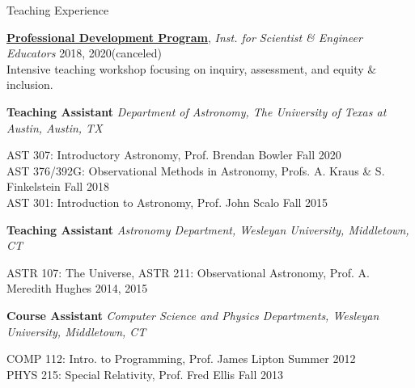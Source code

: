 \documentclass{resume} %
\begin{document}
\begin{rSection}{Teaching Experience}\itemsep -5pt  

    {\bf \href{https://isee.ucsc.edu/programs/pdp/}{Professional Development Program}}, {\em Inst. for Scientist \& Engineer Educators} \hfill 2018, 2020(canceled)\\
    Intensive teaching workshop focusing on inquiry, assessment, and equity \& inclusion.

    {\bf Teaching Assistant} {\em Department of Astronomy, The University of Texas at Austin, Austin, TX}
    \vspace{-5pt}
    \begin{changemargin}{0.3in}{0in}
    AST 307: Introductory Astronomy, Prof. Brendan Bowler \hfill {Fall 2020}\\
    AST 376/392G: Observational Methods in Astronomy, Profs. A. Kraus \& S. Finkelstein \hfill {Fall 2018}\\
    AST 301: Introduction to Astronomy, Prof. John Scalo \hfill {Fall 2015}
    \end{changemargin}
    



    {\bf Teaching Assistant} {\em Astronomy Department, Wesleyan University, Middletown, CT}
    \vspace{-5pt}
    \begin{changemargin}{0.3in}{0in}
    ASTR 107: The Universe, ASTR 211: Observational Astronomy, Prof. A. Meredith Hughes \hfill {2014, 2015}
    \end{changemargin}

    {\bf Course Assistant} {\em Computer Science and Physics Departments, Wesleyan University, Middletown, CT}
    \vspace{-5pt}
    \begin{changemargin}{0.3in}{0in}
    COMP 112: Intro. to Programming, Prof. James Lipton \hfill {Summer 2012}\\
    PHYS 215: Special Relativity, Prof. Fred Ellis \hfill {Fall 2013}
    \end{changemargin}
\vspace{-5pt}
\end{rSection}
 
\end{document}
